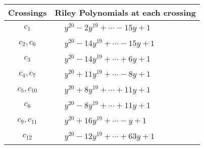 \documentclass[1p]{elsarticle_modified}
\theoremstyle{definition}
\begin{document}
\begin{tabular}{m{50pt}|m{274pt}}
Crossings & \hspace{64pt}Riley Polynomials at each crossing \\
\hline $$\begin{aligned}c_{1}\end{aligned}$$&$\begin{aligned}
&y^{20}-2 y^{19}+\cdots-15 y+1
\end{aligned}$\\
\hline $$\begin{aligned}c_{2},c_{6}\end{aligned}$$&$\begin{aligned}
&y^{20}-14 y^{19}+\cdots-15 y+1
\end{aligned}$\\
\hline $$\begin{aligned}c_{3}\end{aligned}$$&$\begin{aligned}
&y^{20}-14 y^{19}+\cdots+6 y+1
\end{aligned}$\\
\hline $$\begin{aligned}c_{4},c_{7}\end{aligned}$$&$\begin{aligned}
&y^{20}+11 y^{19}+\cdots-8 y+1
\end{aligned}$\\
\hline $$\begin{aligned}c_{5},c_{10}\end{aligned}$$&$\begin{aligned}
&y^{20}+8 y^{19}+\cdots+11 y+1
\end{aligned}$\\
\hline $$\begin{aligned}c_{8}\end{aligned}$$&$\begin{aligned}
&y^{20}-8 y^{19}+\cdots+11 y+1
\end{aligned}$\\
\hline $$\begin{aligned}c_{9},c_{11}\end{aligned}$$&$\begin{aligned}
&y^{20}+16 y^{19}+\cdots- y+1
\end{aligned}$\\
\hline $$\begin{aligned}c_{12}\end{aligned}$$&$\begin{aligned}
&y^{20}-12 y^{19}+\cdots+63 y+1
\end{aligned}$\\
\hline
\end{tabular}\\~\\
\end{document}
